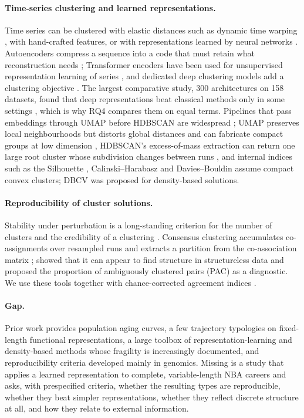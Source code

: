 \paragraph{Time-series clustering and learned representations.} Time series can be clustered with elastic distances such as dynamic time warping \citep{sakoe1978,petitjean2011}, with hand-crafted features, or with representations learned by neural networks \citep{aghabozorgi2015,langkvist2014}. Autoencoders compress a sequence into a code that must retain what reconstruction needs \citep{hinton2006}; Transformer encoders have been used for unsupervised representation learning of series \citep{zerveas2021,vaswani2017}, and dedicated deep clustering models add a clustering objective \citep{ma2019}. The largest comparative study, 300 architectures on 158 datasets, found that deep representations beat classical methods only in some settings \citep{lafabregue2022}, which is why RQ4 compares them on equal terms. Pipelines that pass embeddings through UMAP before HDBSCAN are widespread \citep{angelov2020,grootendorst2022,fragkedaki2024,allaoui2020}; UMAP preserves local neighbourhoods but distorts global distances and can fabricate compact groups at low dimension \citep{chari2023}, HDBSCAN's excess-of-mass extraction can return one large root cluster whose subdivision changes between runs \citep{campello2015,mcinnes2017hdbscan}, and internal indices such as the Silhouette \citep{rousseeuw1987}, Calinski--Harabasz \citep{calinski1974} and Davies--Bouldin \citep{davies1979} assume compact convex clusters; DBCV \citep{moulavi2014} was proposed for density-based solutions.

\paragraph{Reproducibility of cluster solutions.} Stability under perturbation is a long-standing criterion for the number of clusters and the credibility of a clustering \citep{benhur2002,vonluxburg2010}. Consensus clustering accumulates co-assignments over resampled runs and extracts a partition from the co-association matrix \citep{monti2003,fred2005,strehl2002}; \citet{senbabaoglu2014} showed that it can appear to find structure in structureless data and proposed the proportion of ambiguously clustered pairs (PAC) as a diagnostic. We use these tools together with chance-corrected agreement indices \citep{hubert1985,vinh2010}.

\paragraph{Gap.} Prior work provides population aging curves, a few trajectory typologies on fixed-length functional representations, a large toolbox of representation-learning and density-based methods whose fragility is increasingly documented, and reproducibility criteria developed mainly in genomics. Missing is a study that applies a learned representation to complete, variable-length NBA careers and asks, with prespecified criteria, whether the resulting types are reproducible, whether they beat simpler representations, whether they reflect discrete structure at all, and how they relate to external information.
